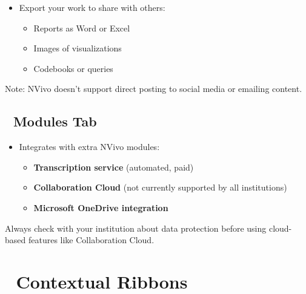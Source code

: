 \documentclass[
  letterpaper,
  DIV=11,
  numbers=noendperiod]{scrreprt}
\providecommand{\tightlist}{%
  \setlength{\itemsep}{0pt}\setlength{\parskip}{0pt}}\usepackage{longtable,booktabs,array}
\begin{document}
\begin{itemize}
\tightlist
\item
  Export your work to share with others:

  \begin{itemize}
  \tightlist
  \item
    Reports as Word or Excel
  \item
    Images of visualizations
  \item
    Codebooks or queries
  \end{itemize}
\end{itemize}

Note: NVivo doesn't support direct posting to social media or emailing
content.

\subsection{🧩 Modules Tab}\label{modules-tab}

\begin{itemize}
\tightlist
\item
  Integrates with extra NVivo modules:

  \begin{itemize}
  \tightlist
  \item
    \textbf{Transcription service} (automated, paid)
  \item
    \textbf{Collaboration Cloud} (not currently supported by all
    institutions)
  \item
    \textbf{Microsoft OneDrive integration}
  \end{itemize}
\end{itemize}

\begin{tcolorbox}[enhanced jigsaw, breakable, left=2mm, colback=white, bottomrule=.15mm, colbacktitle=quarto-callout-warning-color!10!white, leftrule=.75mm, title=\textcolor{quarto-callout-warning-color}{\faExclamationTriangle}\hspace{0.5em}{Warning}, colframe=quarto-callout-warning-color-frame, coltitle=black, toptitle=1mm, opacitybacktitle=0.6, toprule=.15mm, titlerule=0mm, bottomtitle=1mm, arc=.35mm, rightrule=.15mm, opacityback=0]

Always check with your institution about data protection before using
cloud-based features like Collaboration Cloud.

\end{tcolorbox}

\section{🎯 Contextual Ribbons}\label{contextual-ribbons}
\end{document}
